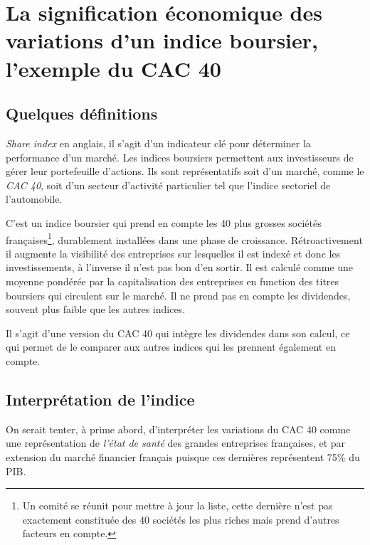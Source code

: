 \documentclass[main.tex]{subfiles}
\begin{document}
\section{La signification économique des variations d'un indice boursier, l'exemple du CAC 40}

\subsection{Quelques définitions}

\begin{definition}
        \emph{Share index} en anglais, il s'agit d'un indicateur clé pour déterminer la performance d'un marché. Les indices boursiers permettent aux investisseurs de gérer leur portefeuille d'actions. Ils sont représentatifs soit d'un marché, comme le \emph{CAC 40}, soit d'un secteur d'activité particulier tel que l'indice sectoriel de l'automobile.
\end{definition}

\begin{definition}[CAC 40]
        C'est un indice boursier qui prend en compte les 40 plus grosses sociétés françaises\footnote{Un comité se réunit pour mettre à jour la liste, cette dernière n'est pas exactement constituée des 40 sociétés les plus riches mais prend d'autres facteurs en compte.}, durablement installées dans une phase de croissance. Rétroactivement il augmente la visibilité des entreprises sur lesquelles il est indexé et donc les investissements, à l'inverse il n'est pas bon d'en sortir. Il est calculé comme une moyenne pondérée par la capitalisation des entreprises en function des titres boursiers qui circulent sur le marché. Il ne prend pas en compte les dividendes, souvent plus faible que les autres indices.
\end{definition}

\begin{definition}
       Il s'agit d'une version du CAC 40 qui intègre les dividendes dans son calcul, ce qui permet de le comparer aux autres indices qui les prennent également en compte. 
\end{definition}

\subsection{Interprétation de l'indice}

On serait tenter, à prime abord, d'interpréter les variations du CAC 40 comme une représentation de \textit{l'état de santé} des grandes entreprises françaises, et par extension du marché financier français puisque ces dernières représentent 75\% du PIB. \\
\end{document}
